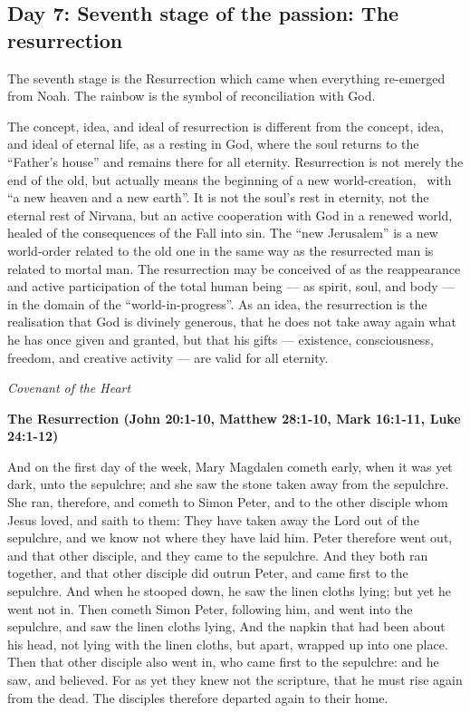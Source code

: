 \subsection*{Day 7: Seventh stage of the passion: The resurrection}
The seventh stage is the Resurrection which came when everything re-emerged from Noah. The rainbow is the symbol of
reconciliation with God.

\begin{quotationx}
The concept, idea, and ideal of resurrection is different from the concept, idea, and ideal of eternal life, as a
resting in God, where the soul returns to the “Father's house” and remains there for all eternity.
Resurrection is not merely the end of the old, but actually means the beginning of a new world-creation,  with “a new
heaven and a new earth”. It is not the soul's rest in eternity, not the eternal rest of Nirvana,
but an active cooperation with God in a renewed world, healed of the consequences of the Fall into sin. The “new
Jerusalem” is a new world-order related to the old one in the same way as the resurrected man is related to mortal man.
The resurrection may be conceived of as the reappearance and active participation of the total human being
— as spirit, soul, and body — in the domain of the “world-in-­progress”. As
an idea, the resurrection is the realisation that God is divinely generous, that he does not take away again what he
has once given and granted, but that his gifts — existence, consciousness, freedom, and creative
activity — are valid for all eternity. \begin{flushright} \textit{Covenant of the Heart}\end{flushright}

\end{quotationx}

\textbf{The Resurrection (John 20:1-10, Matthew 28:1-10, Mark 16:1-11, Luke 24:1-12)}

And on the first day of the week, Mary Magdalen cometh early, when it was yet dark, unto the sepulchre; and she saw the
stone taken away from the sepulchre. She ran, therefore, and cometh to Simon Peter, and to the other disciple whom
Jesus loved, and saith to them: They have taken away the Lord out of the sepulchre, and we know not where they have
laid him. Peter therefore went out, and that other disciple, and they came to the sepulchre. And they both ran
together, and that other disciple did outrun Peter, and came first to the sepulchre. And when he stooped down, he saw
the linen cloths lying; but yet he went not in. Then cometh Simon Peter, following him, and went into the sepulchre,
and saw the linen cloths lying, And the napkin that had been about his head, not lying with the linen cloths, but
apart, wrapped up into one place. Then that other disciple also went in, who came first to the sepulchre: and he saw,
and believed. For as yet they knew not the scripture, that he must rise again from the dead. The disciples therefore
departed again to their home.

